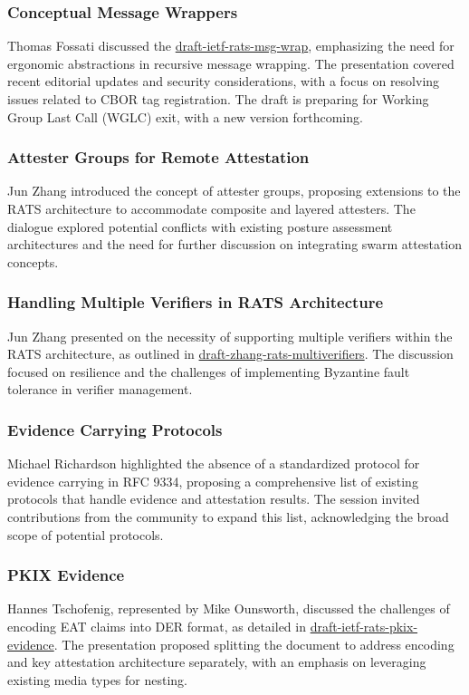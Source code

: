 \documentclass{article}
\begin{document}
\subsubsection{Conceptual Message Wrappers}
Thomas Fossati discussed the \href{https://datatracker.ietf.org/doc/html/draft-ietf-rats-msg-wrap}{draft-ietf-rats-msg-wrap}, emphasizing the need for ergonomic abstractions in recursive message wrapping. The presentation covered recent editorial updates and security considerations, with a focus on resolving issues related to CBOR tag registration. The draft is preparing for Working Group Last Call (WGLC) exit, with a new version forthcoming.

\subsubsection{Attester Groups for Remote Attestation}
Jun Zhang introduced the concept of attester groups, proposing extensions to the RATS architecture to accommodate composite and layered attesters. The dialogue explored potential conflicts with existing posture assessment architectures and the need for further discussion on integrating swarm attestation concepts.

\subsubsection{Handling Multiple Verifiers in RATS Architecture}
Jun Zhang presented on the necessity of supporting multiple verifiers within the RATS architecture, as outlined in \href{https://datatracker.ietf.org/doc/html/draft-zhang-rats-multiverifiers}{draft-zhang-rats-multiverifiers}. The discussion focused on resilience and the challenges of implementing Byzantine fault tolerance in verifier management.

\subsubsection{Evidence Carrying Protocols}
Michael Richardson highlighted the absence of a standardized protocol for evidence carrying in RFC 9334, proposing a comprehensive list of existing protocols that handle evidence and attestation results. The session invited contributions from the community to expand this list, acknowledging the broad scope of potential protocols.

\subsubsection{PKIX Evidence}
Hannes Tschofenig, represented by Mike Ounsworth, discussed the challenges of encoding EAT claims into DER format, as detailed in \href{https://datatracker.ietf.org/doc/html/draft-ietf-rats-pkix-evidence}{draft-ietf-rats-pkix-evidence}. The presentation proposed splitting the document to address encoding and key attestation architecture separately, with an emphasis on leveraging existing media types for nesting.
\end{document}
